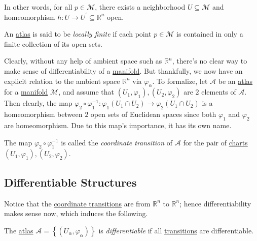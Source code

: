 In other words, for all \(p\in \mathcal{M} \), there exists a neighborhood \(U \subseteq \mathcal{M} \) and homeomorphism \(h\colon U \to U^\prime \subseteq \mathbb{R} ^n\) open.

\begin{definition}\label{def:locally-finite}
	An \hyperref[def:atlas]{atlas} is said to be \emph{locally finite} if each point \(p\in \mathcal{M} \) is contained in only a finite collection of its open sets.
\end{definition}

Clearly, without any help of ambient space such as \(\mathbb{R} ^n\), there's no clear way to make sense of differentiability of a \hyperref[def:topological-manifold]{manifold}. But thankfully, we now have an explicit relation to the ambient space \(\mathbb{R} ^n\) via \(\varphi _\alpha \). To formalize, let \(\mathcal{A} \) be an \hyperref[def:atlas]{atlas} for a \hyperref[def:topological-manifold]{manifold} \(\mathcal{M} \), and assume that \((U_1, \varphi _1), (U_2, \varphi _2)\) are \(2\) elements of \(\mathcal{A} \). Then clearly, the map \(\varphi _2 \circ \varphi _1 ^{-1} \colon \varphi _1(U_1 \cap U_2) \to \varphi _2(U_1 \cap U_2)\) is a homeomorphism between \(2\) open sets of Euclidean spaces since both \(\varphi _1\) and \(\varphi _2\) are homeomorphism. Due to this map's importance, it has its own name.

\begin{definition}\label{def:coordinate-transition}
	The map \(\varphi _2 \circ \varphi _1 ^{-1} \) is called the \emph{coordinate transition} of \(\mathcal{A} \) for the pair of \hyperref[def:coordinate-chart]{charts} \((U_1, \varphi _1), (U_2, \varphi _2)\).
\end{definition}

\begin{center}
\end{center}

\subsection{Differentiable Structures}
Notice that the \hyperref[def:coordinate-transition]{coordinate transitions} are from \(\mathbb{R} ^n\) to \(\mathbb{R} ^n\); hence differentiability makes sense now, which induces the following.

\begin{definition}\label{def:differentiable-atlas}
	The \hyperref[def:atlas]{atlas} \(\mathcal{A} = \left\{ (U_\alpha , \varphi _\alpha) \right\} \) is \emph{differentiable} if all \hyperref[def:coordinate-transition]{transitions} are differentiable.
\end{definition}

